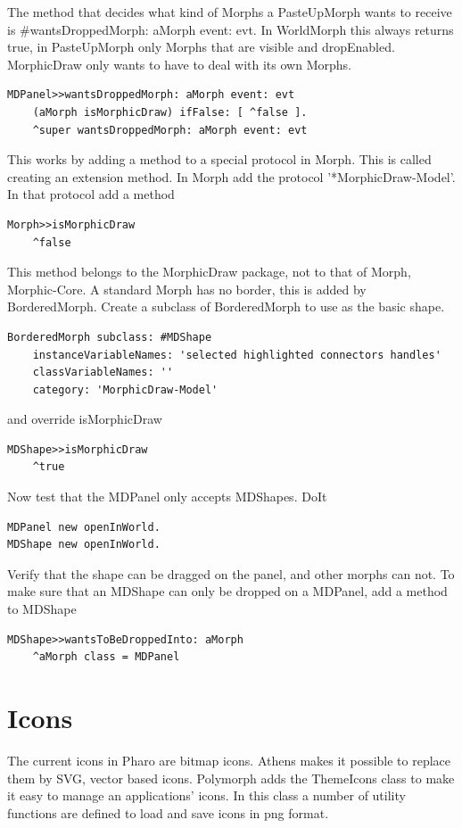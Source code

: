 \documentclass[10pt]{article}   	%
\begin{document}
The method that decides what kind of Morphs a PasteUpMorph wants 
to receive is \#wantsDroppedMorph: aMorph event: evt. In WorldMorph this
always returns true, in PasteUpMorph only Morphs that are visible and
dropEnabled. MorphicDraw only wants to have to deal with its own 
Morphs. 
\begin{verbatim}
MDPanel>>wantsDroppedMorph: aMorph event: evt
    (aMorph isMorphicDraw) ifFalse: [ ^false ].
    ^super wantsDroppedMorph: aMorph event: evt
\end{verbatim}
This works by adding a method to a special protocol in Morph.
This is called creating an extension method.
In Morph add the protocol '*MorphicDraw-Model'.
In that protocol add a method
\begin{verbatim}
Morph>>isMorphicDraw
    ^false
\end{verbatim}
This method belongs to the MorphicDraw package, not to 
that of Morph, Morphic-Core.
A standard Morph has no border, this is added by BorderedMorph.
Create a subclass of BorderedMorph to use as the basic shape.
\begin{verbatim}
BorderedMorph subclass: #MDShape
    instanceVariableNames: 'selected highlighted connectors handles'
    classVariableNames: ''
    category: 'MorphicDraw-Model'
\end{verbatim}
and override isMorphicDraw
\begin{verbatim}
MDShape>>isMorphicDraw
    ^true
\end{verbatim}
Now test that the MDPanel only accepts MDShapes. 
DoIt
\begin{verbatim}
MDPanel new openInWorld.
MDShape new openInWorld.
\end{verbatim}
Verify that the shape can be dragged on the panel, and other morphs can not.
To make sure that an MDShape can only be dropped on a MDPanel,
add a method to MDShape
\begin{verbatim}
MDShape>>wantsToBeDroppedInto: aMorph
    ^aMorph class = MDPanel
\end{verbatim}

\section{Icons\label{Icons}}
The current icons in Pharo are bitmap icons. Athens makes it possible
to replace them by SVG, vector based icons. Polymorph adds the 
ThemeIcons class to make it easy to manage an applications' icons.
In this class a number of utility functions are defined to load and save
icons in png format. 
\end{document}
